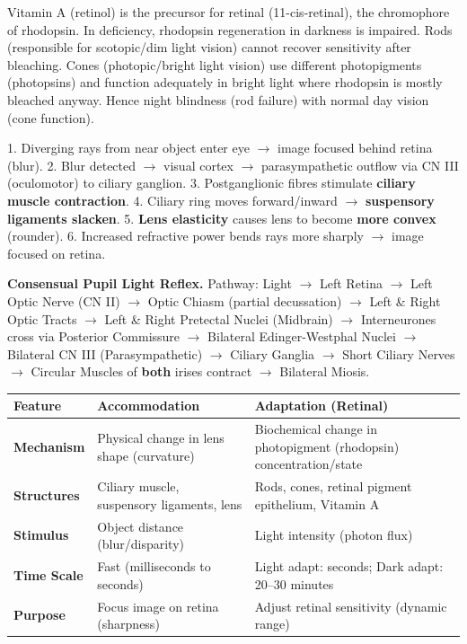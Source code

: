 \documentclass[11pt]{article}
\begin{document}
\begin{corrige}[Exercise 1]
Vitamin A (retinol) is the precursor for retinal (11-cis-retinal), the chromophore of rhodopsin. In deficiency, rhodopsin regeneration in darkness is impaired. Rods (responsible for scotopic/dim light vision) cannot recover sensitivity after bleaching. Cones (photopic/bright light vision) use different photopigments (photopsins) and function adequately in bright light where rhodopsin is mostly bleached anyway. Hence night blindness (rod failure) with normal day vision (cone function).
\end{corrige}

\begin{corrige}[Exercise 2]
1. Diverging rays from near object enter eye $\to$ image focused behind retina (blur). 2. Blur detected $\to$ visual cortex $\to$ parasympathetic outflow via CN III (oculomotor) to ciliary ganglion. 3. Postganglionic fibres stimulate \textbf{ciliary muscle contraction}. 4. Ciliary ring moves forward/inward $\to$ \textbf{suspensory ligaments slacken}. 5. \textbf{Lens elasticity} causes lens to become \textbf{more convex} (rounder). 6. Increased refractive power bends rays more sharply $\to$ image focused on retina.
\end{corrige}

\begin{corrige}[Exercise 3]
\textbf{Consensual Pupil Light Reflex.} Pathway: Light $\to$ Left Retina $\to$ Left Optic Nerve (CN II) $\to$ Optic Chiasm (partial decussation) $\to$ Left \& Right Optic Tracts $\to$ Left \& Right Pretectal Nuclei (Midbrain) $\to$ Interneurones cross via Posterior Commissure $\to$ Bilateral Edinger-Westphal Nuclei $\to$ Bilateral CN III (Parasympathetic) $\to$ Ciliary Ganglia $\to$ Short Ciliary Nerves $\to$ Circular Muscles of \textbf{both} irises contract $\to$ Bilateral Miosis.
\end{corrige}

\begin{corrige}[Exercise 4]
\begin{center}
\begin{tabularx}{\linewidth}{|l|X|X|}\hline
\textbf{Feature} & \textbf{Accommodation} & \textbf{Adaptation (Retinal)} \\ \hline
\textbf{Mechanism} & Physical change in lens shape (curvature) & Biochemical change in photopigment (rhodopsin) concentration/state \\ \hline
\textbf{Structures} & Ciliary muscle, suspensory ligaments, lens & Rods, cones, retinal pigment epithelium, Vitamin A \\ \hline
\textbf{Stimulus} & Object distance (blur/disparity) & Light intensity (photon flux) \\ \hline
\textbf{Time Scale} & Fast (milliseconds to seconds) & Light adapt: seconds; Dark adapt: 20--30 minutes \\ \hline
\textbf{Purpose} & Focus image on retina (sharpness) & Adjust retinal sensitivity (dynamic range) \\ \hline
\end{tabularx}
\end{center}
\end{corrige}
\end{document}

